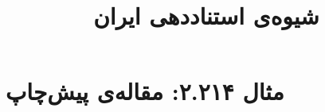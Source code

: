 \documentclass[a4paper,10pt]{article}
\begin{document}
\title{شیوه‌ی استناددهی ایران
 }
\author{}
\date{}
\maketitle



\section*{مثال ۲.۲۱۴: مقاله‌ی پیش‌چاپ}

\cite{علیدوستی1385}\\
\cite{lockwood1988}\\






\end{document}
